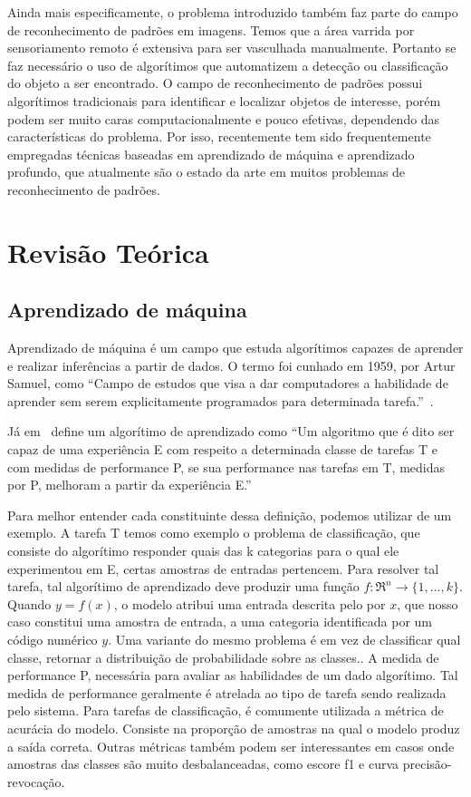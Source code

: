 Ainda mais especificamente, o problema introduzido também faz parte do campo de reconhecimento de padrões em imagens. Temos que a área varrida por sensoriamento remoto é extensiva para ser vasculhada manualmente. Portanto se faz necessário o uso de algorítimos que automatizem a detecção ou classificação do objeto a ser encontrado.
O campo de reconhecimento de padrões possui algorítimos tradicionais para identificar e localizar objetos de interesse, porém podem ser muito caras computacionalmente e pouco efetivas, dependendo das características do problema. Por isso, recentemente tem sido frequentemente empregadas técnicas baseadas em aprendizado de máquina e aprendizado profundo, que atualmente são o estado da arte em muitos problemas de reconhecimento de padrões.


\section{Revisão Teórica}\label{sec:Cap2_revisao_teorica}

\subsection{Aprendizado de máquina}\label{sec:aprendizado_maquina}

Aprendizado de máquina é um campo que estuda algorítimos capazes de aprender e realizar inferências a partir de dados. O termo foi cunhado em 1959, por Artur Samuel, como “Campo de estudos que visa a dar computadores a habilidade de aprender sem serem explicitamente programados para determinada tarefa.”~\cite{Samuel1959SomeSI}.

Já em~\cite{Mitchell97} define um algorítimo de aprendizado como “Um algoritmo que é dito ser capaz de uma experiência E com respeito a determinada classe de tarefas T e com medidas de performance P, se sua performance nas tarefas em T, medidas por P, melhoram a partir da experiência E.”

Para melhor entender cada constituinte dessa definição, podemos utilizar de um exemplo. A tarefa T temos como exemplo o problema de classificação, que consiste do algorítimo responder quais das k categorias para o qual ele experimentou em E, certas amostras de entradas pertencem. Para resolver tal tarefa, tal algorítimo de aprendizado deve produzir uma função \(f:\Re^n\rightarrow \{1,\ldots,k\}\). Quando \( y=f(x) \), o modelo atribui uma entrada descrita pelo por \(x\), que nosso caso constitui uma amostra de entrada, a uma categoria identificada por um código numérico \(y\). Uma variante do mesmo problema é em vez de classificar qual classe, retornar a distribuição de probabilidade sobre as classes.\cite{GoodBengCour16}. A medida de performance P, necessária para avaliar as habilidades de um dado algorítimo. Tal medida de performance geralmente é atrelada ao tipo de tarefa sendo realizada pelo sistema. Para tarefas de classificação, é comumente utilizada a métrica de acurácia do modelo. Consiste na proporção de amostras na qual o modelo produz a saída correta. Outras métricas também podem ser interessantes em casos onde amostras das classes são muito desbalanceadas, como escore f1 e curva precisão-revocação.


